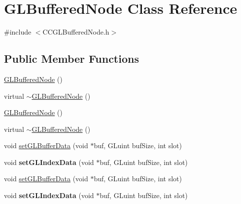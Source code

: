 \hypertarget{classGLBufferedNode}{}\section{G\+L\+Buffered\+Node Class Reference}
\label{classGLBufferedNode}


{\ttfamily \#include $<$C\+C\+G\+L\+Buffered\+Node.\+h$>$}

\subsection*{Public Member Functions}
\begin{DoxyCompactItemize}
\item 
\hyperlink{classGLBufferedNode_a2d05ca6744926c28faf9779005ac1ad9}{G\+L\+Buffered\+Node} ()
\item 
virtual \hyperlink{classGLBufferedNode_a96f53c640a040348861086874aa7c680}{$\sim$\+G\+L\+Buffered\+Node} ()
\item 
\hyperlink{classGLBufferedNode_a2d05ca6744926c28faf9779005ac1ad9}{G\+L\+Buffered\+Node} ()
\item 
virtual \hyperlink{classGLBufferedNode_a369171469f81319961f3de6f25fdff6b}{$\sim$\+G\+L\+Buffered\+Node} ()
\end{DoxyCompactItemize}
\textbf{ }\par
\begin{DoxyCompactItemize}
\item 
void \hyperlink{classGLBufferedNode_a7799428baab534f9b49a8b7467f56849}{set\+G\+L\+Buffer\+Data} (void $\ast$buf, G\+Luint buf\+Size, int slot)
\item 
\mbox{\label{classGLBufferedNode_a0e42edccd5b3e24bcbc3bc177f5eb0e5}} 
void {\bfseries set\+G\+L\+Index\+Data} (void $\ast$buf, G\+Luint buf\+Size, int slot)
\end{DoxyCompactItemize}

\textbf{ }\par
\begin{DoxyCompactItemize}
\item 
void \hyperlink{classGLBufferedNode_a7799428baab534f9b49a8b7467f56849}{set\+G\+L\+Buffer\+Data} (void $\ast$buf, G\+Luint buf\+Size, int slot)
\item 
\mbox{\label{classGLBufferedNode_a0e42edccd5b3e24bcbc3bc177f5eb0e5}} 
void {\bfseries set\+G\+L\+Index\+Data} (void $\ast$buf, G\+Luint buf\+Size, int slot)
\end{DoxyCompactItemize}

